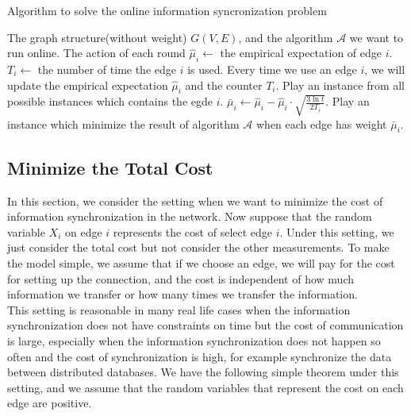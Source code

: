 \documentclass{article}
\theoremstyle{plain}
\theoremstyle{definition}
\theoremstyle{remark}
\begin{document}
    \begin{algorithm}
        \caption{Algorithm to solve the online information syncronization problem}
        \label{cucb}
        \begin{algorithmic}[1]
        \Require The graph structure(without weight) $G(V,E)$, and the algorithm $\mathcal A$ we want to run online.
        \Ensure The action of each round
            \State $\hat \mu_i \leftarrow$ the empirical expectation of edge $i$.
            \State $T_i \leftarrow$ the number of time the edge $i$ is used.
            \State Every time we use an edge $i$, we will update the empirical expectation $\hat \mu_i$ and the counter $T_i$.
                \State Play an instance from all possible instances which contains the egde $i$.
            \EndFor
                \State $\bar\mu_i \leftarrow \hat\mu_i - \hat\mu_i\cdot\sqrt{\frac{3\ln t}{2T_i}}$. 
                \State Play an instance which minimize the result of algorithm $\mathcal A$ when each edge has weight $\bar\mu_i$.
            \EndFor
        \EndProcedure
        \end{algorithmic}
    \end{algorithm}

    \subsection{Minimize the Total Cost}
    In this section, we consider the setting when we want to minimize the cost of information synchronization in the network. Now suppose that the random variable $X_i$ on edge $i$ represents the cost of select edge $i$. Under this setting, we just consider the total cost but not consider the other measurements. To make the model simple, we assume that if we choose an edge, we will pay for the cost for setting up the connection, and the cost is independent of how much information we transfer or how many times we transfer the information.\\
    
    This setting is reasonable in many real life cases when the information synchronization does not have constraints on time but the cost of communication is large, especially when the information synchronization does not happen so often and the cost of synchronization is high, for example synchronize the data between distributed databases. We have the following simple theorem under this setting, and we assume that the random variables that represent the cost on each edge are positive.\\
\end{document}
